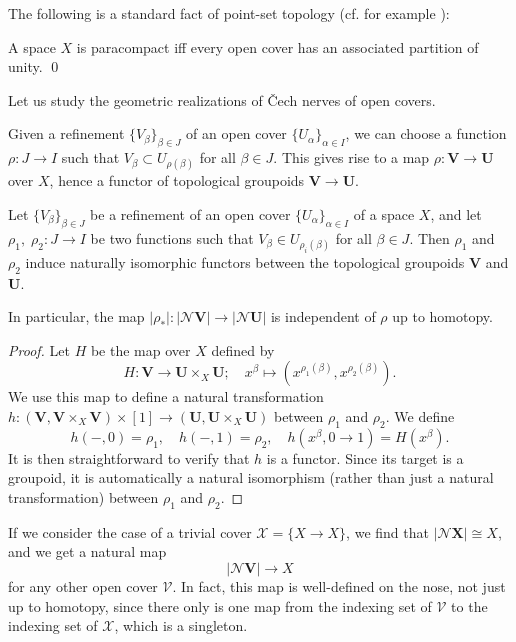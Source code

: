 \documentclass[a4paper,openany]{scrbook}
\newcommand{\nerve}{\mathcal N}
\begin{document}
The following is a standard fact of point-set topology (cf. for example \cite[Chapter I.12]{bredon:topology-geometry}):

\begin{prop}
A space $X$ is paracompact iff every open cover has an associated partition of unity. \qed
\end{prop}

Let us study the geometric realizations of \v Cech nerves of open covers. 

Given a refinement $\{V_\beta\}_{\beta \in J}$ of an open cover $\{U_\alpha\}_{\alpha \in I}$, we can choose a function $\rho\colon J \to I$ such that $V_\beta \subset U_{\rho(\beta)}$ for all $\beta \in J$. This gives rise to a map $\rho\colon \mathbf V \to \mathbf U$ over $X$, hence a functor of topological groupoids $\mathbf V \to \mathbf U$.

\begin{prop} \label{prop:refinementhomotopyinvariant}
Let $\{V_\beta\}_{\beta \in J}$ be a refinement of an open cover $\{U_\alpha\}_{\alpha \in I}$ of a space $X$, and let $\rho_1,\;\rho_2\colon J \to I$ be two functions such that $V_\beta \in U_{\rho_i(\beta)}$ for all $\beta \in J$. Then $\rho_1$ and $\rho_2$ induce naturally isomorphic functors between the topological groupoids $\mathbf V$ and $\mathbf U$.

In particular, the map $|\rho_*|\colon |\nerve\mathbf V| \to |\nerve \mathbf U|$ is independent of $\rho$ up to homotopy.
\end{prop}
\begin{proof}
Let $H$ be the map over $X$ defined by
\[
H\colon \mathbf V \to \mathbf U \times_X \mathbf U; \quad x^\beta \mapsto (x^{\rho_1(\beta)},x^{\rho_2(\beta)}).
\]
We use this map to define a natural transformation $h\colon (\mathbf V,\mathbf V \times_X \mathbf V) \times [1] \to (\mathbf U,\mathbf U \times_X \mathbf U)$ between $\rho_1$ and $\rho_2$. We define
\[
h(-,0) = \rho_1, \quad h(-,1) = \rho_2, \quad h(x^\beta,0 \to 1) = H(x^\beta).
\]
It is then straightforward to verify that $h$ is a functor. Since its target is a groupoid, it is automatically a natural isomorphism (rather than just a natural transformation) between $\rho_1$ and $\rho_2$.
\end{proof}

If we consider the case of a trivial cover $\mathcal X = \{X \to X\}$, we find that $|\nerve \mathbf X| \cong X$, and we get a natural map
\[
|\nerve\mathbf V| \to X
\]
for any other open cover $\mathcal V$. In fact, this map is well-defined on the nose, not just up to homotopy, since there only is one map from the indexing set of $\mathcal V$ to the indexing set of $\mathcal X$, which is a singleton.
\end{document}
